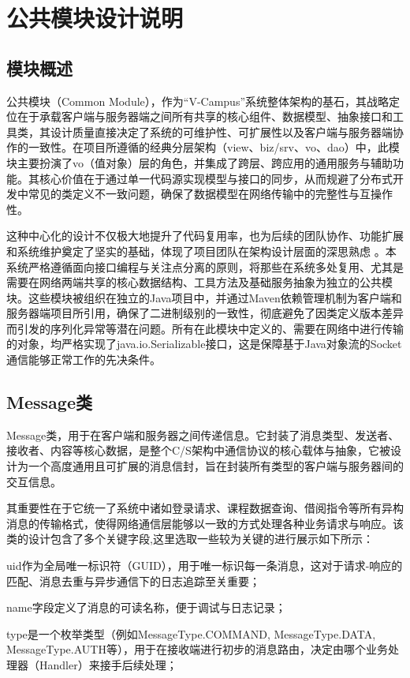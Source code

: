 \documentclass[a4paper]{ctexart}
\begin{document}
\section{公共模块设计说明}
\subsection{模块概述}
公共模块（Common Module），作为“V-Campus”系统整体架构的基石，其战略定位在于承载客户端与服务器端之间所有共享的核心组件、数据模型、抽象接口和工具类，其设计质量直接决定了系统的可维护性、可扩展性以及客户端与服务器端协作的一致性。在项目所遵循的经典分层架构（view、biz/srv、vo、dao）中，此模块主要扮演了vo（值对象）层的角色，并集成了跨层、跨应用的通用服务与辅助功能。其核心价值在于通过单一代码源实现模型与接口的同步，从而规避了分布式开发中常见的类定义不一致问题，确保了数据模型在网络传输中的完整性与互操作性。

这种中心化的设计不仅极大地提升了代码复用率，也为后续的团队协作、功能扩展和系统维护奠定了坚实的基础，体现了项目团队在架构设计层面的深思熟虑 。本系统严格遵循面向接口编程与关注点分离的原则，将那些在系统多处复用、尤其是需要在网络两端共享的核心数据结构、工具方法及基础服务抽象为独立的公共模块。这些模块被组织在独立的Java项目中，并通过Maven依赖管理机制为客户端和服务器端项目所引用，确保了二进制级别的一致性，彻底避免了因类定义版本差异而引发的序列化异常等潜在问题。所有在此模块中定义的、需要在网络中进行传输的对象，均严格实现了java.io.Serializable接口，这是保障基于Java对象流的Socket通信能够正常工作的先决条件。
\subsection{Message类}
Message类，用于在客户端和服务器之间传递信息。它封装了消息类型、发送者、接收者、内容等核心数据，是整个C/S架构中通信协议的核心载体与抽象，它被设计为一个高度通用且可扩展的消息信封，旨在封装所有类型的客户端与服务器间的交互信息。

其重要性在于它统一了系统中诸如登录请求、课程数据查询、借阅指令等所有异构消息的传输格式，使得网络通信层能够以一致的方式处理各种业务请求与响应。该类的设计包含了多个关键字段,这里选取一些较为关键的进行展示如下所示：

uid作为全局唯一标识符（GUID），用于唯一标识每一条消息，这对于请求-响应的匹配、消息去重与异步通信下的日志追踪至关重要；

name字段定义了消息的可读名称，便于调试与日志记录；

type是一个枚举类型（例如MessageType.COMMAND, MessageType.DATA, MessageType.AUTH等），用于在接收端进行初步的消息路由，决定由哪个业务处理器（Handler）来接手后续处理；
\end{document}

